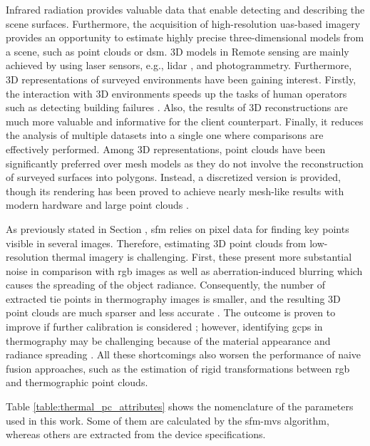 Infrared radiation provides valuable data that enable detecting and describing the scene surfaces. Furthermore, the acquisition of high-resolution \acrshort{uas}-based imagery provides an opportunity to estimate highly precise three-dimensional models from a scene, such as point clouds or \acrshort{dsm}. 3D models in Remote sensing are mainly achieved by using laser sensors, e.g., \acrshort{lidar} \cite{yandun_narvaez_survey_2017}, and photogrammetry. Furthermore, 3D representations of surveyed environments have been gaining interest. Firstly, the interaction with 3D environments speeds up the tasks of human operators such as detecting building failures \cite{lin_fusion_2019}. Also, the results of 3D reconstructions are much more valuable and informative for the client counterpart. Finally, it reduces the analysis of multiple datasets into a single one where comparisons are effectively performed. Among 3D representations, point clouds have been significantly preferred over mesh models as they do not involve the reconstruction of surveyed surfaces \cite{park_comparison_2019} into polygons. Instead, a discretized version is provided, though its rendering has been proved to achieve nearly mesh-like results with modern hardware and large point clouds \cite{schutz_rendering_2021}.   

As previously stated in Section , \acrshort{sfm} relies on pixel data for finding key points visible in several images. Therefore, estimating 3D point clouds from low-resolution thermal imagery is challenging. First, these present more substantial noise in comparison with \acrshort{rgb} images \cite{sledz_thermal_2018} as well as aberration-induced blurring which causes the spreading of the object radiance. Consequently, the number of extracted tie points in thermography images is smaller, and the resulting 3D point clouds are much sparser and less accurate \cite{jarzabek-rychard_supervised_2020}. The outcome is proven to improve if further calibration is considered \cite{ribeiro-gomes_uncooled_2017}; however, identifying \acrshort{gcp}s in thermography may be challenging because of the material appearance and radiance spreading \cite{javadnejad_photogrammetric_2020}. All these shortcomings also worsen the performance of naive fusion approaches, such as the estimation of rigid transformations between \acrshort{rgb} and thermographic point clouds. 

Table \ref{table:thermal_pc_attributes} shows the nomenclature of the parameters used in this work. Some of them are calculated by the \acrshort{sfm}-\acrshort{mvs} algorithm, whereas others are extracted from the device specifications.

